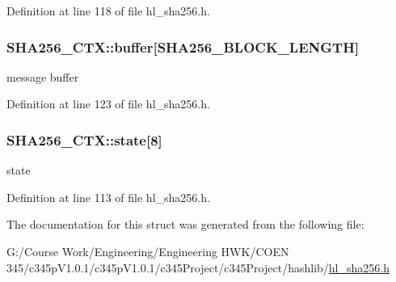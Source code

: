 Definition at line 118 of file hl\_\-sha256.h.\hypertarget{struct_s_h_a256___c_t_x_afdec8b9d90f712d82d60415e61b0ac5f}{
\subsubsection[{buffer}]{ {\bf SHA256\_\-CTX::buffer}\mbox{[}SHA256\_\-BLOCK\_\-LENGTH\mbox{]}}}
\label{struct_s_h_a256___c_t_x_afdec8b9d90f712d82d60415e61b0ac5f}
message buffer 

Definition at line 123 of file hl\_\-sha256.h.\hypertarget{struct_s_h_a256___c_t_x_a0a537d66d075486a6e35b21f9b8b16c3}{
\subsubsection[{state}]{ {\bf SHA256\_\-CTX::state}\mbox{[}8\mbox{]}}}
\label{struct_s_h_a256___c_t_x_a0a537d66d075486a6e35b21f9b8b16c3}
state 

Definition at line 113 of file hl\_\-sha256.h.

The documentation for this struct was generated from the following file:\begin{DoxyCompactItemize}
\item 
G:/Course Work/Engineering/Engineering HWK/COEN 345/c345pV1.0.1/c345pV1.0.1/c345Project/c345Project/hashlib/\hyperlink{hl__sha256_8h}{hl\_\-sha256.h}\end{DoxyCompactItemize}
